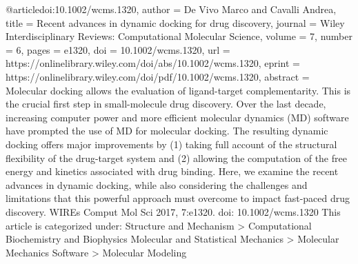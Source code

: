 @article{doi:10.1002/wcms.1320,
author = {De Vivo Marco and Cavalli Andrea},
title = {Recent advances in dynamic docking for drug discovery},
journal = {Wiley Interdisciplinary Reviews: Computational Molecular Science},
volume = {7},
number = {6},
pages = {e1320},
doi = {10.1002/wcms.1320},
url = {https://onlinelibrary.wiley.com/doi/abs/10.1002/wcms.1320},
eprint = {https://onlinelibrary.wiley.com/doi/pdf/10.1002/wcms.1320},
abstract = {Molecular docking allows the evaluation of ligand-target complementarity. This is the crucial first step in small-molecule drug discovery. Over the last decade, increasing computer power and more efficient molecular dynamics (MD) software have prompted the use of MD for molecular docking. The resulting dynamic docking offers major improvements by (1) taking full account of the structural flexibility of the drug-target system and (2) allowing the computation of the free energy and kinetics associated with drug binding. Here, we examine the recent advances in dynamic docking, while also considering the challenges and limitations that this powerful approach must overcome to impact fast-paced drug discovery. WIREs Comput Mol Sci 2017, 7:e1320. doi: 10.1002/wcms.1320 This article is categorized under: Structure and Mechanism > Computational Biochemistry and Biophysics Molecular and Statistical Mechanics > Molecular Mechanics Software > Molecular Modeling}
}